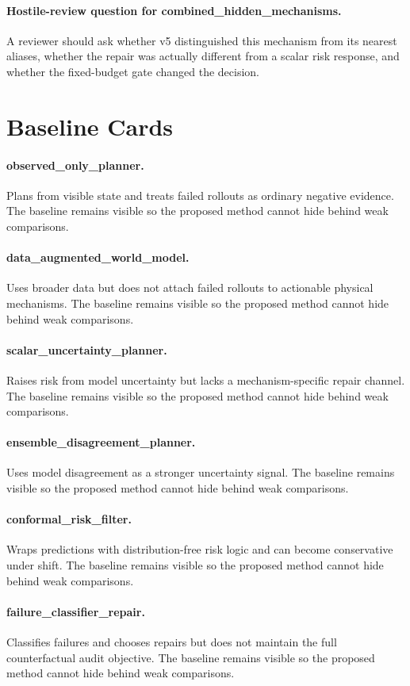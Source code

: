 \documentclass{article}
\begin{document}
\paragraph{Hostile-review question for combined\_hidden\_mechanisms.} A reviewer should ask whether v5 distinguished this mechanism from its nearest aliases, whether the repair was actually different from a scalar risk response, and whether the fixed-budget gate changed the decision.
\clearpage
\section{Baseline Cards}
\paragraph{observed\_only\_planner.} Plans from visible state and treats failed rollouts as ordinary negative evidence. The baseline remains visible so the proposed method cannot hide behind weak comparisons.
\paragraph{data\_augmented\_world\_model.} Uses broader data but does not attach failed rollouts to actionable physical mechanisms. The baseline remains visible so the proposed method cannot hide behind weak comparisons.
\paragraph{scalar\_uncertainty\_planner.} Raises risk from model uncertainty but lacks a mechanism-specific repair channel. The baseline remains visible so the proposed method cannot hide behind weak comparisons.
\paragraph{ensemble\_disagreement\_planner.} Uses model disagreement as a stronger uncertainty signal. The baseline remains visible so the proposed method cannot hide behind weak comparisons.
\paragraph{conformal\_risk\_filter.} Wraps predictions with distribution-free risk logic and can become conservative under shift. The baseline remains visible so the proposed method cannot hide behind weak comparisons.
\paragraph{failure\_classifier\_repair.} Classifies failures and chooses repairs but does not maintain the full counterfactual audit objective. The baseline remains visible so the proposed method cannot hide behind weak comparisons.
\end{document}
